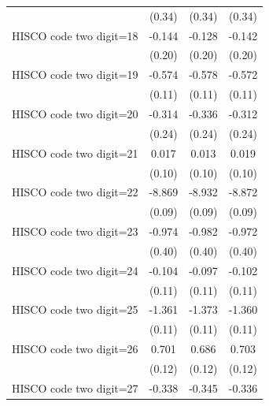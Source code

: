 {\begin{tabular}{l*{3}{c}}
                    &      (0.34)         &      (0.34)         &      (0.34)         \\
HISCO code two digit=18&      -0.144         &      -0.128         &      -0.142         \\
                    &      (0.20)         &      (0.20)         &      (0.20)         \\
HISCO code two digit=19&      -0.574\sym{***}&      -0.578\sym{***}&      -0.572\sym{***}\\
                    &      (0.11)         &      (0.11)         &      (0.11)         \\
HISCO code two digit=20&      -0.314         &      -0.336         &      -0.312         \\
                    &      (0.24)         &      (0.24)         &      (0.24)         \\
HISCO code two digit=21&       0.017         &       0.013         &       0.019         \\
                    &      (0.10)         &      (0.10)         &      (0.10)         \\
HISCO code two digit=22&      -8.869\sym{***}&      -8.932\sym{***}&      -8.872\sym{***}\\
                    &      (0.09)         &      (0.09)         &      (0.09)         \\
HISCO code two digit=23&      -0.974\sym{**} &      -0.982\sym{**} &      -0.972\sym{**} \\
                    &      (0.40)         &      (0.40)         &      (0.40)         \\
HISCO code two digit=24&      -0.104         &      -0.097         &      -0.102         \\
                    &      (0.11)         &      (0.11)         &      (0.11)         \\
HISCO code two digit=25&      -1.361\sym{***}&      -1.373\sym{***}&      -1.360\sym{***}\\
                    &      (0.11)         &      (0.11)         &      (0.11)         \\
HISCO code two digit=26&       0.701\sym{***}&       0.686\sym{***}&       0.703\sym{***}\\
                    &      (0.12)         &      (0.12)         &      (0.12)         \\
HISCO code two digit=27&      -0.338\sym{***}&      -0.345\sym{***}&      -0.336\sym{***}\\

\end{tabular}}
